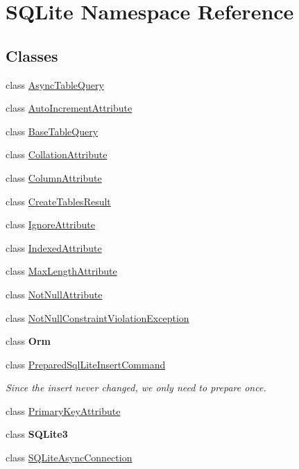 \hypertarget{namespaceSQLite}{}\section{S\+Q\+Lite Namespace Reference}
\label{namespaceSQLite}
\subsection*{Classes}
\begin{DoxyCompactItemize}
\item 
class \hyperlink{classSQLite_1_1AsyncTableQuery}{Async\+Table\+Query}
\item 
class \hyperlink{classSQLite_1_1AutoIncrementAttribute}{Auto\+Increment\+Attribute}
\item 
class \hyperlink{classSQLite_1_1BaseTableQuery}{Base\+Table\+Query}
\item 
class \hyperlink{classSQLite_1_1CollationAttribute}{Collation\+Attribute}
\item 
class \hyperlink{classSQLite_1_1ColumnAttribute}{Column\+Attribute}
\item 
class \hyperlink{classSQLite_1_1CreateTablesResult}{Create\+Tables\+Result}
\item 
class \hyperlink{classSQLite_1_1IgnoreAttribute}{Ignore\+Attribute}
\item 
class \hyperlink{classSQLite_1_1IndexedAttribute}{Indexed\+Attribute}
\item 
class \hyperlink{classSQLite_1_1MaxLengthAttribute}{Max\+Length\+Attribute}
\item 
class \hyperlink{classSQLite_1_1NotNullAttribute}{Not\+Null\+Attribute}
\item 
class \hyperlink{classSQLite_1_1NotNullConstraintViolationException}{Not\+Null\+Constraint\+Violation\+Exception}
\item 
class {\bfseries Orm}
\item 
class \hyperlink{classSQLite_1_1PreparedSqlLiteInsertCommand}{Prepared\+Sql\+Lite\+Insert\+Command}
\begin{DoxyCompactList}\small\item\em Since the insert never changed, we only need to prepare once. \end{DoxyCompactList}\item 
class \hyperlink{classSQLite_1_1PrimaryKeyAttribute}{Primary\+Key\+Attribute}
\item 
class {\bfseries S\+Q\+Lite3}
\item 
class \hyperlink{classSQLite_1_1SQLiteAsyncConnection}{S\+Q\+Lite\+Async\+Connection}

\end{DoxyCompactItemize}
